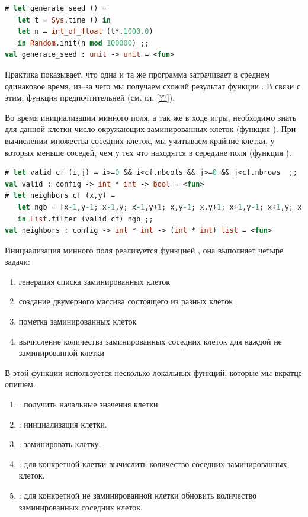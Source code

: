 \begin{lstlisting}[language=OCaml]
# let generate_seed () =
   let t = Sys.time () in
   let n = int_of_float (t*.1000.0) 
   in Random.init(n mod 100000) ;;
val generate_seed : unit -> unit = <fun>
\end{lstlisting}

Практика показывает, что одна и та же программа затрачивает в среднем одинаковое 
время, из–за чего мы получаем схожий результат функции . В 
связи с этим, функция  предпочтительней (см. гл. \ref{??}).

Во время инициализации минного поля, а так же в ходе игры, необходимо знать для 
данной клетки число окружающих заминированных клеток (функция 
). При вычислении множества соседних клеток, мы учитываем 
крайние клетки, у которых меньше соседей, чем у тех что находятся в середине 
поля (функция ).

\begin{lstlisting}[language=OCaml]
# let valid cf (i,j) = i>=0 && i<cf.nbcols && j>=0 && j<cf.nbrows  ;;
val valid : config -> int * int -> bool = <fun>
# let neighbors cf (x,y) =
   let ngb = [x-1,y-1; x-1,y; x-1,y+1; x,y-1; x,y+1; x+1,y-1; x+1,y; x+1,y+1]
   in List.filter (valid cf) ngb ;;
val neighbors : config -> int * int -> (int * int) list = <fun>
\end{lstlisting}

Инициализация минного поля реализуется функцией , она 
выполняет четыре задачи:

\begin{enumerate}
	\item генерация списка заминированных клеток

	\item создание двумерного массива состоящего из разных клеток

	\item пометка заминированных клеток

	\item вычисление количества заминированных соседних клеток для каждой 
не заминированной клетки
\end{enumerate}

В этой функции используется несколько локальных функций, которые мы вкратце 
опишем.

\begin{enumerate}
	\item {}: получить начальные значения клетки.

	\item {}: инициализация клетки.

	\item {}: заминировать клетку.

	\item {}: для конкретной клетки вычислить количество 
соседних заминированных клеток.

	\item {}: для конкретной не заминированной клетки обновить 
количество заминированных соседних клеток. 
\end{enumerate}

